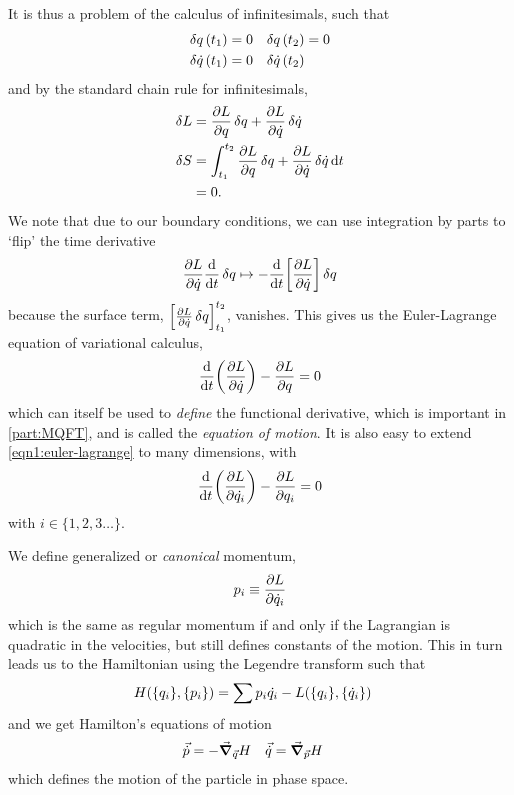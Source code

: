 \documentclass[notes.tex]{subfiles}
\begin{document}
It is thus a problem of the calculus of infinitesimals, such that
\begin{align*}
  \var{q}(t_1) &= 0 & \var{q}(t_2) &= 0 \\
  \var{\dot{q}}(t_1) &= 0 & \var{\dot{q}}(t_2)
\end{align*}
and by the standard chain rule for infinitesimals, 
\begin{align*}
  \var{L} &= \pdv{L}{q}\var{q} + \pdv{L}{\dot{q}}\var{\dot{q}}\\
  \var{S} &= \int_{t_1}^{t_2}\pdv{L}{q}\var{q} + \pdv{L}{\dot{q}}\var{\dot{q}} \dd{t}\\
  &= 0.
\end{align*}
We note that due to our boundary conditions, we can use integration by parts to `flip' the time derivative
\begin{equation*}
  \pdv{L}{\dot{q}}\dv{t} \var{q} \mapsto - \dv{t}\qty[\pdv{L}{\dot{q}}] \var{q}
\end{equation*}
because the surface term, $\qty[\pdv{L}{\dot{q}}\var{q}]_{t_1}^{t_2}$, vanishes. 
This gives us the Euler-Lagrange equation of variational calculus,
\begin{equation}
  \dv{t}(\pdv{L}{\dot{q}}) - \pdv{L}{q} = 0 \label{eqn1:euler-lagrange}
\end{equation}
which can itself be used to \emph{define} the functional derivative, which is important in \autoref{part:MQFT}, and is called the \emph{equation of motion}. 
It is also easy to extend \autoref{eqn1:euler-lagrange} to many dimensions, with 
\begin{equation*}
  \dv{t}(\pdv{L}{\dot{q_i}}) - \pdv{L}{q_i} = 0
\end{equation*}
with $i \in \{1, 2, 3 \ldots\}$.

We define generalized or \emph{canonical} momentum, \begin{equation*}
  p_i \equiv \pdv{L}{\dot{q}_i}
\end{equation*}
which is the same as regular momentum if and only if the Lagrangian is quadratic in the velocities, but still defines constants of the motion. 
This in turn leads us to the Hamiltonian using the Legendre transform such that
\begin{align*}
  H\qty(\qty{q_i}, \qty{p_i}) &= \sum p_i \dot{q_i} - L\qty(\qty{q_i}, \qty{\dot{q}_i})
\end{align*}
and we get Hamilton's equations of motion
\begin{align}
  \vec{\dot{p}} &= -\grad_{\vec{q}} H & \vec{\dot{q}} &= \grad_{\vec{p}} H \label{eqn:rqft_cft_hamiltonian-eom}
\end{align}
which defines the motion of the particle in phase space.
\end{document}

